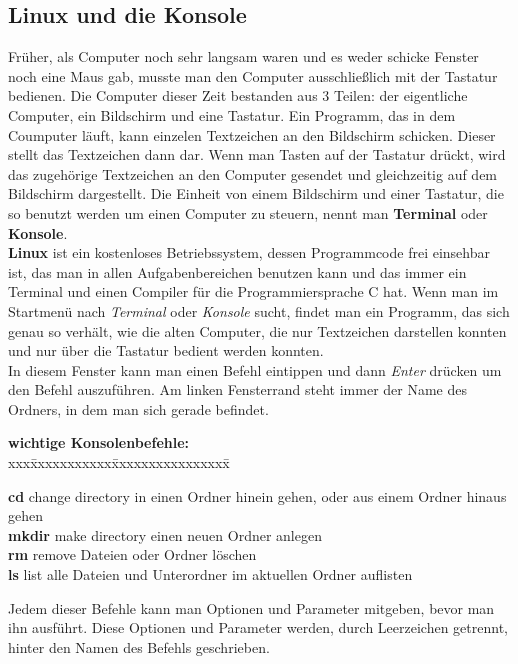 \documentclass[c_worksheet.tex]{subfiles}
\begin{document}
\subsection{Linux und die Konsole}
Früher, als Computer noch sehr langsam waren und es weder schicke Fenster noch eine Maus gab, musste man den Computer ausschließlich mit der Tastatur bedienen.
Die Computer dieser Zeit bestanden aus 3 Teilen: der eigentliche Computer, ein Bildschirm und eine Tastatur.
Ein Programm, das in dem Coumputer läuft, kann einzelen Textzeichen an den Bildschirm schicken. Dieser stellt das Textzeichen dann dar.
Wenn man Tasten auf der Tastatur drückt, wird das zugehörige Textzeichen an den Computer gesendet und gleichzeitig auf dem Bildschirm dargestellt.
Die Einheit von einem Bildschirm und einer Tastatur, die so benutzt werden um einen Computer zu steuern, nennt man \textbf{Terminal} oder \textbf{Konsole}.\\

\textbf{Linux} ist ein kostenloses Betriebssystem, dessen Programmcode frei einsehbar ist, das man in allen Aufgabenbereichen benutzen kann und das immer ein Terminal und einen Compiler für die Programmiersprache C hat. Wenn man im Startmenü nach \textit{Terminal} oder \textit{Konsole} sucht, findet man ein Programm, das sich genau so verhält, wie die alten Computer, die nur Textzeichen darstellen konnten und nur über die Tastatur bedient werden konnten.\\
In diesem Fenster kann man einen Befehl eintippen und dann \textit{Enter} drücken um den Befehl auszuführen. Am linken Fensterrand steht immer der Name des Ordners, in dem man sich gerade befindet.\\

\begin{tabbing}
\textbf{wichtige Konsolenbefehle:} \\
xxx\=xxxxxxxxxxx\=xxxxxxxxxxxxxxxx\= \kill

\>\textbf{cd} \>change directory \>in einen Ordner hinein gehen, oder aus einem Ordner hinaus gehen \\
\>\textbf{mkdir} \>make directory \>einen neuen Ordner anlegen \\
\>\textbf{rm} \>remove \>Dateien oder Ordner löschen \\
\>\textbf{ls} \>list \>alle Dateien und Unterordner im aktuellen Ordner auflisten \\
\end{tabbing}
Jedem dieser Befehle kann man Optionen und Parameter mitgeben, bevor man ihn ausführt. Diese Optionen und Parameter werden, durch Leerzeichen getrennt, hinter den Namen des Befehls geschrieben.\\
\end{document}
